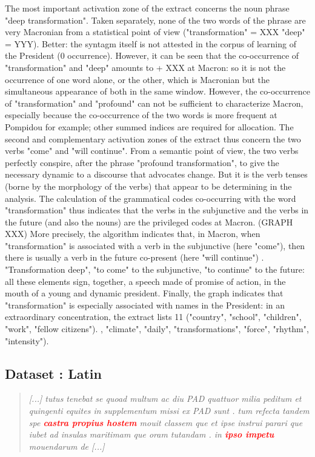 The most important activation zone of the extract concerns the noun phrase "deep transformation".
Taken separately, none of the two words of the phrase are very Macronian from a statistical point of view ("transformation" = XXX "deep" = YYY). Better: the syntagm itself is not attested in the corpus of learning of the President (0 occurrence).
However, it can be seen that the co-occurrence of "transformation" and "deep" amounts to + XXX at Macron: so it is not the occurrence of one word alone, or the other, which is Macronian but the simultaneous appearance of both in the same window.
However, the co-occurrence of "transformation" and "profound" can not be sufficient to characterize Macron, especially because the co-occurrence of the two words is more frequent at Pompidou for example; other summed indices are required for allocation.
The second and complementary activation zones of the extract thus concern the two verbs "come" and "will continue".
From a semantic point of view, the two verbs perfectly conspire, after the phrase "profound transformation", to give the necessary dynamic to a discourse that advocates change. But it is the verb tenses (borne by the morphology of the verbs) that appear to be determining in the analysis.
The calculation of the grammatical codes co-occurring with the word "transformation" thus indicates that the verbs in the subjunctive and the verbs in the future (and also the nouns) are the privileged codes at Macron. (GRAPH XXX)
More precisely, the algorithm indicates that, in Macron, when "transformation" is associated with a verb in the subjunctive (here "come"), then there is usually a verb in the future co-present (here "will continue") .
"Transformation deep", "to come" to the subjunctive, "to continue" to the future: all these elements sign, together, a speech made of promise of action, in the mouth of a young and dynamic president.
Finally, the graph indicates that "transformation" is especially associated with names in the President: in an extraordinary concentration, the extract lists 11 ("country", "school", "children", "work", "fellow citizens"). , "climate", "daily", "transformations", "force", "rhythm", "intensity").

\subsection{Dataset : Latin}

\begin{quote}
\textit{[...] tutus tenebat se quoad multum ac diu PAD quattuor milia peditum et quingenti equites in supplementum missi ex PAD sunt . tum refecta tandem spe \textcolor{red}{\textbf{castra propius hostem}} mouit classem que et ipse instrui parari que iubet ad insulas maritimam que oram tutandam . in \textcolor{red}{\textbf{ipso impetu}} mouendarum de [...]} 
\end{quote}

